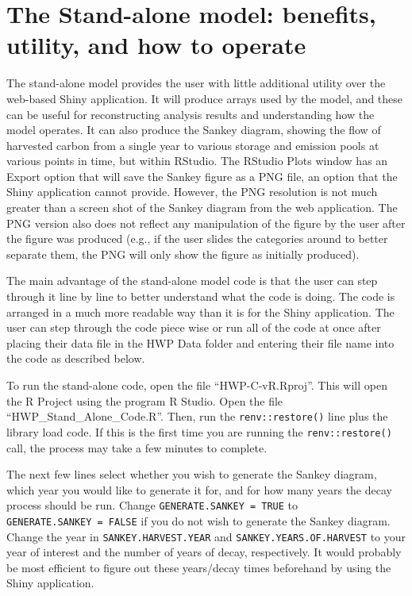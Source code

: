 \documentclass[
  openany]{book}
\begin{document}
\hypertarget{dnld-sa}{%
\section{The Stand-alone model: benefits, utility, and how to
operate}\label{dnld-sa}}

The stand-alone model provides the user with little additional utility
over the web-based Shiny application. It will produce arrays used by the
model, and these can be useful for reconstructing analysis results and
understanding how the model operates. It can also produce the Sankey
diagram, showing the flow of harvested carbon from a single year to
various storage and emission pools at various points in time, but within
RStudio. The RStudio Plots window has an Export option that will save
the Sankey figure as a PNG file, an option that the Shiny application
cannot provide. However, the PNG resolution is not much greater than a
screen shot of the Sankey diagram from the web application. The PNG
version also does not reflect any manipulation of the figure by the user
after the figure was produced (e.g., if the user slides the categories
around to better separate them, the PNG will only show the figure as
initially produced).

The main advantage of the stand-alone model code is that the user can
step through it line by line to better understand what the code is
doing. The code is arranged in a much more readable way than it is for
the Shiny application. The user can step through the code piece wise or
run all of the code at once after placing their data file in the HWP
Data folder and entering their file name into the code as described
below.

To run the stand-alone code, open the file ``HWP-C-vR.Rproj''. This will
open the R Project using the program R Studio. Open the file
``HWP\_Stand\_Alone\_Code.R''. Then, run the \texttt{renv::restore()}
line plus the library load code. If this is the first time you are
running the \texttt{renv::restore()} call, the process may take a few
minutes to complete.

The next few lines select whether you wish to generate the Sankey
diagram, which year you would like to generate it for, and for how many
years the decay process should be run. Change
\texttt{GENERATE.SANKEY\ =\ TRUE} to \texttt{GENERATE.SANKEY\ =\ FALSE}
if you do not wish to generate the Sankey diagram. Change the year in
\texttt{SANKEY.HARVEST.YEAR} and \texttt{SANKEY.YEARS.OF.HARVEST} to
your year of interest and the number of years of decay, respectively. It
would probably be most efficient to figure out these years/decay times
beforehand by using the Shiny application.
\end{document}
